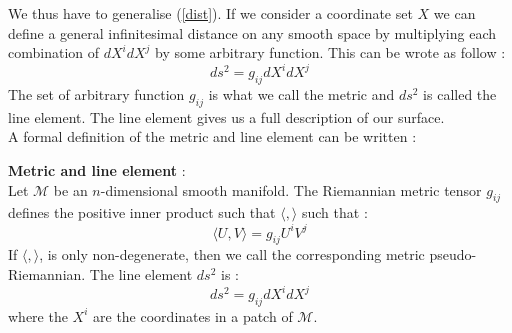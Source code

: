 \documentclass[a4paper,12pt]{article}
\theoremstyle{definition}
\begin{document}
We thus have to generalise (\ref{dist}).
If we consider a coordinate set $X$ we can define a general infinitesimal distance on any smooth space by multiplying each combination of $dX^idX^j$ by some arbitrary function.
This can be wrote as follow :
\begin{equation}
	ds^2=g_{ij}dX^idX^j
\end{equation}
The set of arbitrary function $g_{ij}$ is what we call the metric and $ds^2$ is called the line element.
The line element gives us a full description of our surface.\\
A formal definition of the metric and line element can be written :
\begin{definition}
	\textbf{Metric and line element} :\\
	Let $\mathcal{M}$ be an $n$-dimensional smooth manifold.
	The Riemannian metric tensor $g_{ij}$ defines the positive inner product such that $\langle , \rangle$ such that : 
	\begin{equation}
		\langle U , V \rangle = g_{ij}U^iV^j
	\end{equation}
	If $\langle , \rangle$, is only non-degenerate, then we call the corresponding metric pseudo-Riemannian.
	The line element $ds^2$ is :
	\begin{equation}
		ds^2=g_{ij}dX^idX^j
	\end{equation}
	where the $X^i$ are the coordinates in a patch of $\mathcal{M}$.
\end{definition}
\end{document}
